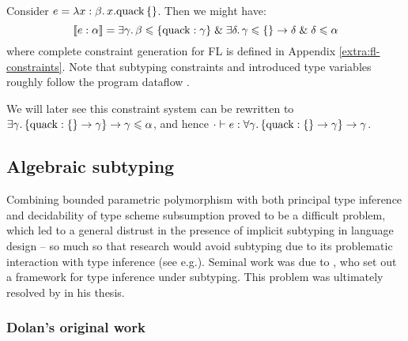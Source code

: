 \begin{example}
    Consider $e = \lambda {x: \beta} \ldotp {x}{.}{\mathrm{quack}}\,\{\}$. Then we might have:
    $$ \denot{e : \alpha} = \exists \gamma \ldotp \beta \sub \flrec{\mathrm{quack}: \gamma} \und \exists \delta \ldotp \gamma \sub \flrec{} \to \delta \und \delta \sub \alpha $$
    where complete constraint generation for FL is defined in Appendix \ref{extra:fl-constraints}. Note that subtyping constraints and introduced type variables roughly follow the program dataflow \cite{mlsub}.

    We will later see this constraint system can be rewritten to $\exists \gamma \ldotp \flrec{\mathrm{quack} : \flrec{} \to \gamma} \to \gamma \sub \alpha$, and hence $\cdot \vdash e : \forall \gamma \ldotp \flrec{\mathrm{quack} : \flrec{} \to \gamma} \to \gamma$.
\end{example}


\subsection{Algebraic subtyping}

Combining bounded parametric polymorphism with both principal type inference and decidability of type scheme subsumption proved to be a difficult problem, which led to a general distrust in the presence of implicit subtyping in language design \cite{mlstruct} -- so much so that research would avoid subtyping due to its problematic interaction with type inference (see e.g.\@ \cite[Section~3.5]{linear-haskell}). Seminal work was due to \textcite{pottier-thesis}, who set out a framework for type inference under subtyping. This problem was ultimately resolved by \textcite{dolan-thesis} in his thesis.

\color{red}
\subsubsection{Dolan's original work}

